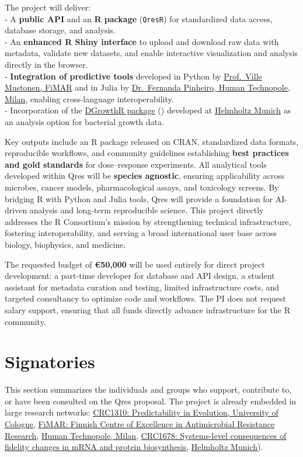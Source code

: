 \documentclass[
]{article}
\begin{document}
The project will deliver:\\
- A \textbf{public API} and an \textbf{R package} (\texttt{QresR}) for
standardized data access, database storage, and analysis.\\
- An \textbf{enhanced R Shiny interface} to upload and download raw data
with metadata, validate new datasets, and enable interactive
visualization and analysis directly in the browser.\\
- \textbf{Integration of predictive tools} developed in Python by
\href{https://www.fimar.fi/}{Prof.~Ville Mustonen, FiMAR} and in Julia
by \href{https://humantechnopole.it/en/}{Dr.~Fernanda Pinheiro, Human
Technopole, Milan}, enabling cross-language interoperability.\\
- Incorporation of the
\href{https://bio-datascience.github.io/DGrowthR/}{DGrowthR package}
() developed at
\href{https://www.helmholtz-munich.de/en}{Helmholtz Munich} as an
analysis option for bacterial growth data.

Key outputs include an R package released on CRAN, standardized data
formats, reproducible workflows, and community guidelines establishing
\textbf{best practices and gold standards} for dose--response
experiments. All analytical tools developed within Qres will be
\textbf{species agnostic}, ensuring applicability across microbes,
cancer models, pharmacological assays, and toxicology screens. By
bridging R with Python and Julia tools, Qres will provide a foundation
for AI-driven analysis and long-term reproducible science. This project
directly addresses the R Consortium's mission by strengthening technical
infrastructure, fostering interoperability, and serving a broad
international user base across biology, biophysics, and medicine.

The requested budget of \textbf{€50,000} will be used entirely for
direct project development: a part-time developer for database and API
design, a student assistant for metadata curation and testing, limited
infrastructure costs, and targeted consultancy to optimize code and
workflows. The PI does not request salary support, ensuring that all
funds directly advance infrastructure for the R community.

\section{Signatories}\label{signatories}

This section summarizes the individuals and groups who support,
contribute to, or have been consulted on the Qres proposal. The project
is already embedded in large research networks:
\href{https://crc1310.uni-koeln.de/}{CRC1310: Predictability in
Evolution, University of Cologne}, \href{https://www.fimar.fi/}{FiMAR:
Finnish Centre of Excellence in Antimicrobial Resistance Research},
\href{https://humantechnopole.it/en/}{Human Technopole, Milan},
\href{https://crc1678.uni-koeln.de/}{CRC1678: Systems-level consequences
of fidelity changes in mRNA and protein biosynthesis},
\href{https://www.helmholtz-munich.de/en}{Helmholtz Munich}).
\end{document}
